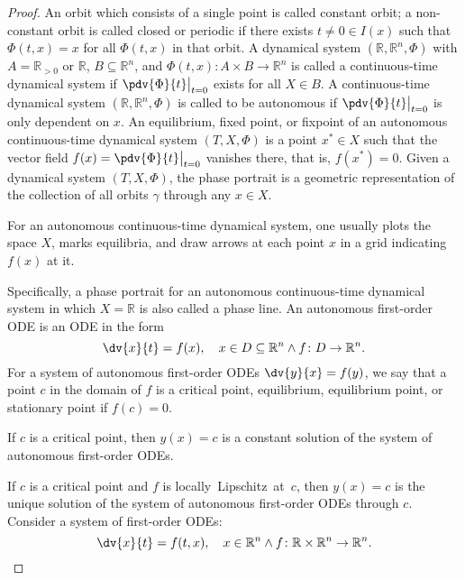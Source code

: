 \documentclass[a4paper,12pt]{report}
\begin{document}
\begin{proof}
{{{{{{An orbit which consists of a single point is called constant orbit; a non-constant orbit is called closed or periodic if there exists $t\neq 0\in I(x)$ such that $\Phi (t,x)=x$ for all $\Phi(t,x)$ in that orbit.
A dynamical system $(\mathbb{R}, \mathbb{R}^n, \Phi)$ with $A=\mathbb{R}_{>0}$ or $\mathbb{R}$, $B\subseteq\mathbb{R}^n$, and $\Phi(t,x)\colon A\times B\to\mathbb{R}^n$ is called a continuous-time dynamical system if $\pdv{\Phi}{t}\big\vert_{t=0}$ exists for all $X\in B$.
A continuous-time dynamical system $(\mathbb{R}, \mathbb{R}^n, \Phi)$ is called to be autonomous if $\pdv{\Phi}{t}\big\vert_{t=0}$ is only dependent on $x$.
An equilibrium, fixed point, or fixpoint of an autonomous continuous-time dynamical system $(T, X, \Phi)$ is a point $x^*\in X$ such that the vector field $f(x)=\pdv{\Phi}{t}\big\vert_{t=0}$ vanishes there, that is, $f(x^*)=0$.
Given a dynamical system $(T, X, \Phi)$, the phase portrait is a geometric representation of the collection of all orbits $\gamma$ through any $x\in X$.

For an autonomous continuous-time dynamical system, one usually plots the space $X$, marks equilibria, and draw arrows at each point $x$ in a grid indicating $f(x)$ at it.

Specifically, a phase portrait for an autonomous continuous-time dynamical system in which $X=\mathbb{R}$ is also called a phase line.
An autonomous first-order ODE is an ODE in the form 
\[\dv{x}{t}=f(x),\quad x\in D\subseteq\mathbb{R}^n\land f\colon D\to\mathbb{R}^n.\]
For a system of autonomous first-order ODEs $\dv{y}{x}=f(y)$, we say that a point $c$ in the domain of $f$ is a critical point, equilibrium, equilibrium point, or stationary point if $f(c)=0$.

If $c$ is a critical point, then $y(x)=c$ is a constant solution of the system of autonomous first-order ODEs.

If $c$ is a critical point and $f$ is locally Lipschitz at $c$, then $y(x)=c$ is the unique solution of the system of autonomous first-order ODEs through $c$.
Consider a system of first-order ODEs:
\[\dv{x}{t}=f(t,x), \quad x\in\mathbb{R}^n\land f\colon\mathbb{R}\times\mathbb{R}^n\to\mathbb{R}^n.\]

}}}}}}
\end{proof}
\end{document}
